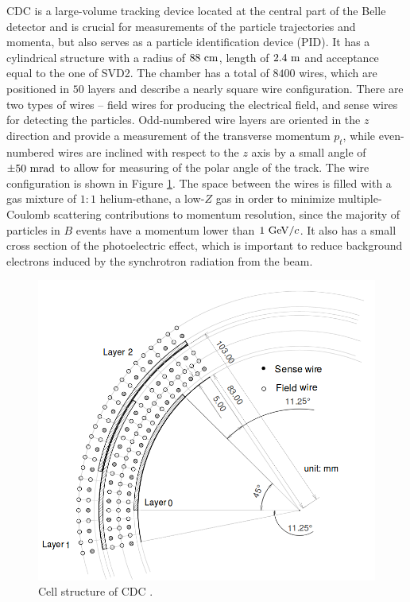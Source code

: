 CDC is a large-volume tracking device located at the central part of the Belle detector and is crucial for measurements of the particle trajectories and momenta, but also serves as a particle identification device (PID). It has a cylindrical structure with a radius of $88\mathrm{~cm}$, length of $2.4\mathrm{~m}$ and acceptance equal to the one of SVD2. The chamber has a total of $8400$ wires, which are positioned in $50$ layers and describe a nearly square wire configuration. There are two types of wires -- field wires for producing the electrical field, and sense wires for detecting the particles. Odd-numbered wire layers are oriented in the $z$ direction and provide a measurement of the transverse momentum $p_t$, while even-numbered wires are inclined with respect to the $z$ axis by a small angle of $\pm 50\mathrm{~mrad}$ to allow for measuring of the polar angle of the track. The wire configuration is shown in Figure \ref{fig:CDC_layout}. The space between the wires is filled with a gas mixture of $1:1$ helium-ethane, a low-$Z$ gas in order to minimize multiple-Coulomb scattering contributions to momentum resolution, since the majority of particles in $B$ events have a momentum lower than $1\mathrm{~GeV}/c$. It also has a small cross section of the photoelectric effect, which is important to reduce background electrons induced by the synchrotron radiation from the beam. 

\begin{figure}[H]
	\centering
	\captionsetup{width=0.8\linewidth}
	\includegraphics[width=0.6\linewidth]{fig/setup/CDC_layout}
	\caption{Cell structure of CDC \cite{ABASHIAN2002117}.}
	\label{fig:CDC_layout}
\end{figure}

